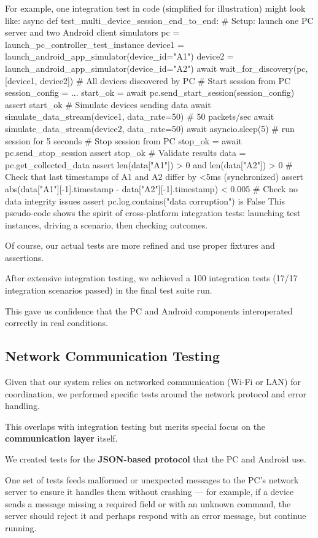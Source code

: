 {{For example, one integration test in code (simplified for illustration) might
look like: async def test\_multi\_device\_session\_end\_to\_end: # Setup: launch
one PC server and two Android client simulators pc =
launch\_pc\_controller\_test\_instance device1 =
launch\_android\_app\_simulator(device\_id="A1") device2 =
launch\_android\_app\_simulator(device\_id="A2") await wait\_for\_discovery(pc,
[device1, device2]) # All devices discovered by PC # Start session from PC
session\_config = {...} start\_ok = await
pc.send\_start\_session(session\_config) assert start\_ok # Simulate devices
sending data await simulate\_data\_stream(device1, data\_rate=50) # 50
packets/sec await simulate\_data\_stream(device2, data\_rate=50) await
asyncio.sleep(5) # run session for 5 seconds # Stop session from PC stop\_ok =
await pc.send\_stop\_session assert stop\_ok # Validate results data =
pc.get\_collected\_data assert len(data["A1"]) > 0 and len(data["A2"]) > 0 #
Check that last timestamps of A1 and A2 differ by <5ms (synchronized) assert
abs(data["A1"][-1].timestamp - data["A2"][-1].timestamp) < 0.005 # Check no data
integrity issues assert pc.log.contains("data corruption") is False This
pseudo-code shows the spirit of cross-platform integration tests: launching test
instances, driving a scenario, then checking outcomes.

Of course, our actual tests are more refined and use proper fixtures and
assertions.

After extensive integration testing, we achieved a 100%
integration tests (17/17 integration scenarios passed) in the final test suite
run.

This gave us confidence that the PC and Android components interoperated
correctly in real conditions.

\subsection{Network Communication Testing}

Given that our system relies on networked communication (Wi-Fi or LAN) for
coordination, we performed specific tests around the network protocol and error
handling.

This overlaps with integration testing but merits special focus on the \textbf{communication layer}
 itself.

We created tests for the \textbf{JSON-based protocol}
 that the PC and Android use.

One set of tests feeds malformed or unexpected messages to the PC's network
server to ensure it handles them without crashing --- for example, if a device
sends a message missing a required field or with an unknown command, the server
should reject it and perhaps respond with an error message, but continue
running.

}}
